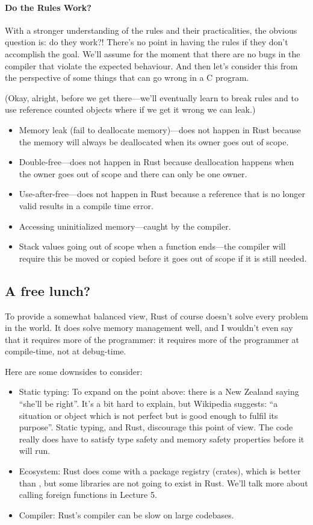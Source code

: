 \paragraph{Do the Rules Work?}
With a stronger understanding of the rules and their practicalities, the obvious question is: do they work?! There's no point in having the rules if they don't accomplish the goal. We'll assume for the moment that there are no bugs in the compiler that violate the expected behaviour. And then let's consider this from the perspective of some things that can go wrong in a C program.

(Okay, alright, before we get there---we'll eventually learn to break rules and to use reference counted objects where if we get it wrong we can leak.)

\begin{itemize}
	\item Memory leak (fail to deallocate memory)---does not happen in Rust because the memory will always be deallocated when its owner goes out of scope.
	\item Double-free---does not happen in Rust because deallocation happens when the owner goes out of scope and there can only be one owner.
	\item Use-after-free---does not happen in Rust because a reference that is no longer valid results in a compile time error.
	\item Accessing uninitialized memory---caught by the compiler.
	\item Stack values going out of scope when a function ends---the compiler will require this be moved or copied before it goes out of scope if it is still needed.
\end{itemize}

\subsection*{A free lunch?}
To provide a somewhat balanced view, Rust of course doesn't solve every problem
in the world. It does solve memory management well, and I wouldn't even say that
it requires more of the programmer: it requires more of the programmer at compile-time,
not at debug-time.

Here are some downsides to consider:
\begin{itemize}
\item Static typing: To expand on the point above: there is a New Zealand saying ``she'll be right''. It's a bit hard to explain, but Wikipedia suggests: ``a situation or object which is not perfect but is good enough to fulfil its purpose''. Static typing, and Rust, discourage this point of view. The code really does have to satisfy type safety and memory safety properties before it will run.
\item Ecosystem: Rust does come with a package registry (crates), which is better than \CPP, but some libraries are not going to exist in Rust. We'll talk more about calling foreign functions in Lecture 5.
\item Compiler: Rust's compiler can be slow on large codebases.
\end{itemize}




